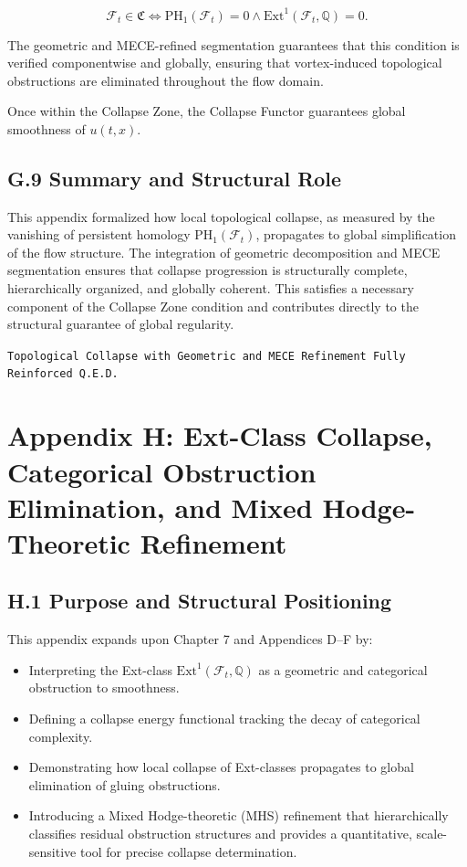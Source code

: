 \documentclass[11pt]{article}
\begin{document}
\[
\mathcal{F}_t \in \mathfrak{C} \iff \mathrm{PH}_1(\mathcal{F}_t) = 0 \land \mathrm{Ext}^1(\mathcal{F}_t, \mathbb{Q}) = 0.
\]

The geometric and MECE-refined segmentation guarantees that this condition is verified componentwise and globally, ensuring that vortex-induced topological obstructions are eliminated throughout the flow domain.

Once within the Collapse Zone, the Collapse Functor guarantees global smoothness of \( u(t, x) \).

\subsection*{G.9 Summary and Structural Role}

This appendix formalized how local topological collapse, as measured by the vanishing of persistent homology \( \mathrm{PH}_1(\mathcal{F}_t) \), propagates to global simplification of the flow structure.  
The integration of geometric decomposition and MECE segmentation ensures that collapse progression is structurally complete, hierarchically organized, and globally coherent.  
This satisfies a necessary component of the Collapse Zone condition and contributes directly to the structural guarantee of global regularity.

\begin{flushright}
\texttt{Topological Collapse with Geometric and MECE Refinement \quad Fully Reinforced \quad Q.E.D.}
\end{flushright}



\section*{Appendix H: Ext-Class Collapse, Categorical Obstruction Elimination, and Mixed Hodge-Theoretic Refinement}

\subsection*{H.1 Purpose and Structural Positioning}

This appendix expands upon Chapter 7 and Appendices D–F by:

\begin{itemize}
  \item Interpreting the Ext-class \( \mathrm{Ext}^1(\mathcal{F}_t, \mathbb{Q}) \) as a geometric and categorical obstruction to smoothness.
  \item Defining a collapse energy functional tracking the decay of categorical complexity.
  \item Demonstrating how local collapse of Ext-classes propagates to global elimination of gluing obstructions.
  \item Introducing a Mixed Hodge-theoretic (MHS) refinement that hierarchically classifies residual obstruction structures and provides a quantitative, scale-sensitive tool for precise collapse determination.
\end{itemize}
\end{document}
